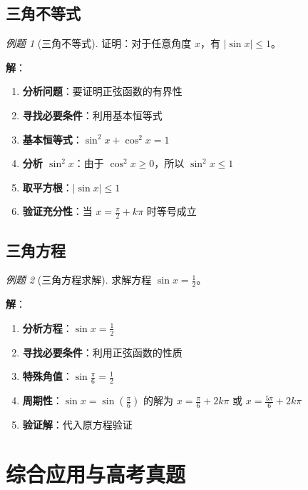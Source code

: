 \documentclass[a4paper,11pt]{ctexart}
\newcommand{\keypoint}[1]{\textcolor{secondary}{\textbf{#1}}}
\theoremstyle{definition}
\theoremstyle{remark}
\newtheorem{example}{例题}[section]
\begin{document}
\subsection{三角不等式}

\begin{example}[三角不等式]
证明：对于任意角度 $x$，有 $|\sin x| \leq 1$。

\textbf{解}：
\begin{enumerate}
    \item \keypoint{分析问题}：要证明正弦函数的有界性
    \item \keypoint{寻找必要条件}：利用基本恒等式
    \item \keypoint{基本恒等式}：$\sin^2 x + \cos^2 x = 1$
    \item \keypoint{分析 $\sin^2 x$}：由于 $\cos^2 x \geq 0$，所以 $\sin^2 x \leq 1$
    \item \keypoint{取平方根}：$|\sin x| \leq 1$
    \item \keypoint{验证充分性}：当 $x = \frac{\pi}{2} + k\pi$ 时等号成立
\end{enumerate}
\end{example}

\subsection{三角方程}

\begin{example}[三角方程求解]
求解方程 $\sin x = \frac{1}{2}$。

\textbf{解}：
\begin{enumerate}
    \item \keypoint{分析方程}：$\sin x = \frac{1}{2}$
    \item \keypoint{寻找必要条件}：利用正弦函数的性质
    \item \keypoint{特殊角值}：$\sin \frac{\pi}{6} = \frac{1}{2}$
    \item \keypoint{周期性}：$\sin x = \sin(\frac{\pi}{6})$ 的解为 $x = \frac{\pi}{6} + 2k\pi$ 或 $x = \frac{5\pi}{6} + 2k\pi$
    \item \keypoint{验证解}：代入原方程验证
\end{enumerate}
\end{example}

\newpage

\section{综合应用与高考真题}
\end{document}
